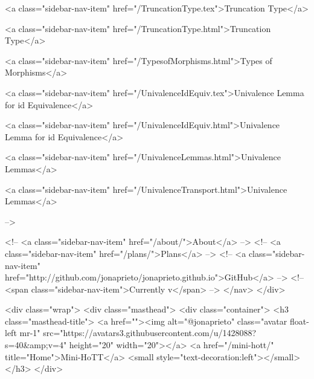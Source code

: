       
    
      
        
          <a class="sidebar-nav-item" href="/TruncationType.tex">Truncation Type</a>
        
      
    
      
        
          <a class="sidebar-nav-item" href="/TruncationType.html">Truncation Type</a>
        
      
    
      
        
          <a class="sidebar-nav-item" href="/TypesofMorphisms.html">Types of Morphisms</a>
        
      
    
      
        
          <a class="sidebar-nav-item" href="/UnivalenceIdEquiv.tex">Univalence Lemma for id Equivalence</a>
        
      
    
      
        
          <a class="sidebar-nav-item" href="/UnivalenceIdEquiv.html">Univalence Lemma for id Equivalence</a>
        
      
    
      
        
          <a class="sidebar-nav-item" href="/UnivalenceLemmas.html">Univalence Lemmas</a>
        
      
    
      
        
          <a class="sidebar-nav-item" href="/UnivalenceTransport.html">Univalence Lemmas</a>
        
      
     -->

    <!-- <a class="sidebar-nav-item" href="/about/">About</a> -->
    <!-- <a class="sidebar-nav-item" href="/plans/">Plans</a> -->
    <!-- <a class="sidebar-nav-item" href="http://github.com/jonaprieto/jonaprieto.github.io">GitHub</a> -->
    <!-- <span class="sidebar-nav-item">Currently v</span> -->
  </nav>
</div>

    <div class="wrap">
      <div class="masthead">
        <div class="container">
          <h3 class="masthead-title">
            <a href=""><img alt="@jonaprieto" class="avatar float-left mr-1" src="https://avatars3.githubusercontent.com/u/1428088?s=40&amp;v=4" height="20" width="20"></a>
            <a href="/mini-hott/" title="Home">Mini-HoTT</a>
            <small style="text-decoration:left"></small>
          </h3>
        </div>
      
